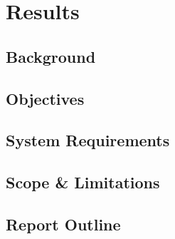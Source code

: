 \documentclass[class=report,11pt,crop=false]{standalone}
\begin{document}
	\chapter{Results}
	
	
	
	
	\section{Background}
	\lipsum[1]
	
	\section{Objectives}
	\lipsum[1]
	
	\section{System Requirements}
	\lipsum[1]
	
	\section{Scope \& Limitations}
	\lipsum[1]
	
	\section{Report Outline}
	\lipsum[1]
	
	\ifstandalone
	
	\printnoidxglossary[type=\acronymtype,nonumberlist]
	\fi
\end{document}
